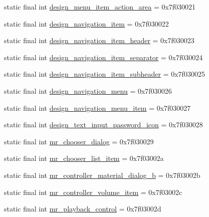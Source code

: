 \begin{CompactItemize}
static final int \hyperlink{classandroid_1_1support_1_1mediacompat_1_1_r_1_1layout_ef59005085378c23126fc6d85700c9b6}{design\_\-menu\_\-item\_\-action\_\-area} = 0x7f030021
\item 
static final int \hyperlink{classandroid_1_1support_1_1mediacompat_1_1_r_1_1layout_17a7f6e137f445120542c14d596ba008}{design\_\-navigation\_\-item} = 0x7f030022
\item 
static final int \hyperlink{classandroid_1_1support_1_1mediacompat_1_1_r_1_1layout_1ae92aafbee56d43fca3aacde408d695}{design\_\-navigation\_\-item\_\-header} = 0x7f030023
\item 
static final int \hyperlink{classandroid_1_1support_1_1mediacompat_1_1_r_1_1layout_5c269ed989d1db710bbc4fe4c3fe18a1}{design\_\-navigation\_\-item\_\-separator} = 0x7f030024
\item 
static final int \hyperlink{classandroid_1_1support_1_1mediacompat_1_1_r_1_1layout_609929fd69303e5e108ac09b410008c9}{design\_\-navigation\_\-item\_\-subheader} = 0x7f030025
\item 
static final int \hyperlink{classandroid_1_1support_1_1mediacompat_1_1_r_1_1layout_ee401343521e2c6d9aaf0359c51e3a35}{design\_\-navigation\_\-menu} = 0x7f030026
\item 
static final int \hyperlink{classandroid_1_1support_1_1mediacompat_1_1_r_1_1layout_2727053776445334d38f2587e58ddaf8}{design\_\-navigation\_\-menu\_\-item} = 0x7f030027
\item 
static final int \hyperlink{classandroid_1_1support_1_1mediacompat_1_1_r_1_1layout_3d6b51836384ac0bd10772050bdec823}{design\_\-text\_\-input\_\-password\_\-icon} = 0x7f030028
\item 
static final int \hyperlink{classandroid_1_1support_1_1mediacompat_1_1_r_1_1layout_eeb189c3cb3862e985934e3fbe46bfd1}{mr\_\-chooser\_\-dialog} = 0x7f030029
\item 
static final int \hyperlink{classandroid_1_1support_1_1mediacompat_1_1_r_1_1layout_9acba05c14c458759255870f3cf28bdb}{mr\_\-chooser\_\-list\_\-item} = 0x7f03002a
\item 
static final int \hyperlink{classandroid_1_1support_1_1mediacompat_1_1_r_1_1layout_b743d077885d616739cb639f59c41597}{mr\_\-controller\_\-material\_\-dialog\_\-b} = 0x7f03002b
\item 
static final int \hyperlink{classandroid_1_1support_1_1mediacompat_1_1_r_1_1layout_1d5d0ec63ece10b5559f4b1a40d1f09b}{mr\_\-controller\_\-volume\_\-item} = 0x7f03002c
\item 
static final int \hyperlink{classandroid_1_1support_1_1mediacompat_1_1_r_1_1layout_d694525c65fa2c28567615e353295575}{mr\_\-playback\_\-control} = 0x7f03002d

\end{CompactItemize}
